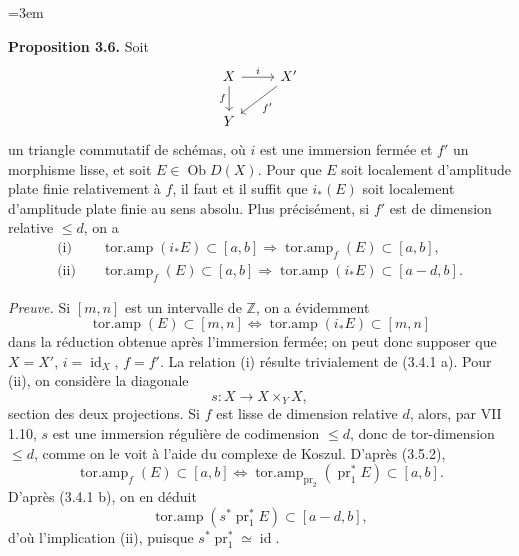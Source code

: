 \documentclass[11pt]{article}
\newcommand{\Spec}{\operatorname{Spec}}
\providecommand{\Coker}{\operatorname{Coker}}
\providecommand{\rank}{\operatorname{rank}}
\begin{document}
\providecommand{\Ob}{\operatorname{Ob}}
\providecommand{\D}{\mathrm D}
\providecommand{\Ho}{\mathrm H}
\providecommand{\RHom}{\mathrm R\!\operatorname{Hom}}
\providecommand{\parfamp}{\operatorname{parf.amp}}
\providecommand{\tamp}{\operatorname{tor.amp}}
\providecommand{\Qcoh}{\operatorname{Qcoh}}
\providecommand{\Mod}{\operatorname{Mod}}
\providecommand{\Coh}{\operatorname{Coh}}
\providecommand{\Lib}{\operatorname{Lib}}
\providecommand{\Loclib}{\operatorname{Loclib}}
\providecommand{\qcoh}{\mathrm{qcoh}}
\providecommand{\coh}{\mathrm{coh}}
\providecommand{\parf}{\mathrm{parf}}
\providecommand{\torf}{\mathrm{torf}}
\providecommand{\id}{\operatorname{id}}
\providecommand{\Coker}{\operatorname{Coker}}
\providecommand{\rank}{\operatorname{rank}}
\providecommand{\rg}{\operatorname{rg}}
\providecommand{\Hom}{\operatorname{Hom}}
\providecommand{\Ext}{\operatorname{Ext}}
\providecommand{\Spec}{\operatorname{Spec}}
\providecommand{\Cone}{\operatorname{Cone}}
\providecommand{\pt}{\operatorname{Pt}}
\providecommand{\ind}{\operatorname{ind}}
\emergencystretch=3em

\textbf{Proposition 3.6.} Soit
\[
\begin{tikzcd}
X \arrow[r,"i"] \arrow[d,"f"'] & X' \arrow[dl,"f'"]\\
Y &
\end{tikzcd}
\]
un triangle commutatif de schémas, où \(i\) est une immersion fermée et \(f'\) un morphisme lisse, et soit \(E\in\Ob D(X)\). Pour que \(E\) soit localement d'amplitude plate finie relativement à \(f\), il faut et il suffit que \(i_*(E)\) soit localement d'amplitude plate finie au sens absolu. Plus précisément, si \(f'\) est de dimension relative \(\leq d\), on a
\begin{align*}
\text{(i)}\quad &\tamp(i_*E)\subset[a,b] \Longrightarrow \tamp_f(E)\subset[a,b],\\
\text{(ii)}\quad &\tamp_f(E)\subset[a,b] \Longrightarrow \tamp(i_*E)\subset[a-d,b].
\end{align*}

\emph{Preuve.} Si \([m,n]\) est un intervalle de \(\mathbb Z\), on a évidemment
\[
 \tamp(E)\subset[m,n]
 \Longleftrightarrow
 \tamp(i_*E)\subset[m,n]
\]
dans la réduction obtenue après l'immersion fermée; on peut donc supposer que \(X=X'\), \(i=\id_X\), \(f=f'\). La relation (i) résulte trivialement de (3.4.1 a). Pour (ii), on considère la diagonale
\[
 s:X\longrightarrow X\times_YX,
\]
section des deux projections. Si \(f\) est lisse de dimension relative \(d\), alors, par VII 1.10, \(s\) est une immersion régulière de codimension \(\leq d\), donc de tor-dimension \(\leq d\), comme on le voit à l'aide du complexe de Koszul. D'après (3.5.2),
\[
 \tamp_f(E)
 \subset[a,b]
 \Longleftrightarrow
 \tamp_{\operatorname{pr}_2}(\operatorname{pr}_1^*E)
 \subset[a,b].
\]
D'après (3.4.1 b), on en déduit
\[
 \tamp(s^*\operatorname{pr}_1^*E)
 \subset[a-d,b],
\]
d'où l'implication (ii), puisque \(s^*\operatorname{pr}_1^*\simeq\id\).
\end{document}
